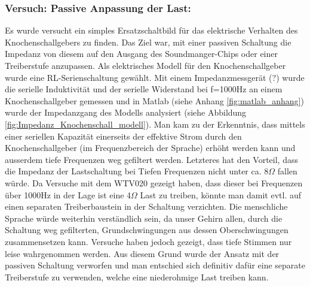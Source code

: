  \subsubsection{Versuch: Passive Anpassung der Last:}
  Es wurde versucht ein simples Ersatzschaltbild für das elektrische Verhalten des Knochenschallgebers zu finden. 
  Das Ziel war, mit einer passiven Schaltung die Impedanz von diesem auf den Ausgang des Soundmanger-Chips oder einer Treiberstufe anzupassen. 
  Als elektrisches Modell für den Knochenschallgeber wurde eine RL-Serienschaltung gewählt. 
  Mit einem Impedanzmessgerät (?) wurde die serielle Induktivität und der serielle Widerstand bei f=1000Hz an einem Knochenschallgeber gemessen und in Matlab (siehe Anhang \ref{fig:matlab_anhang}) wurde der Impedanzgang des Modells analysiert (siehe Abbildung \ref{fig:Impedanz_Knochenschall_modell}). 
  Man kam zu der Erkenntnis, dass mittels einer seriellen Kapazität einerseits der effektive Strom durch den Knochenschallgeber (im Frequenzbereich der Sprache) erhöht werden kann und ausserdem tiefe Frequenzen weg gefiltert werden. 
  Letzteres hat den Vorteil, dass die Impedanz der Lastschaltung bei Tiefen Frequenzen nicht unter ca. 8\(\Omega\) fallen würde. Da Versuche mit dem WTV020 gezeigt haben, dass dieser bei Frequenzen über 1000Hz in der Lage ist eine 4\(\Omega\) Last zu treiben,
   könnte man damit evtl. auf einen separaten Treiberbaustein in der Schaltung verzichten. 
  Die menschliche Sprache würde weiterhin verständlich sein, da unser Gehirn allen, durch die Schaltung weg gefilterten, Grundschwingungen aus dessen Oberschwingungen zusammensetzen kann. 
  Versuche haben jedoch gezeigt, dass tiefe Stimmen nur leise wahrgenommen werden. 
  Aus diesem Grund wurde der Ansatz mit der passiven Schaltung verworfen und man entschied sich definitiv dafür eine separate Treiberstufe zu verwenden, welche eine niederohmige Last treiben kann.
  
